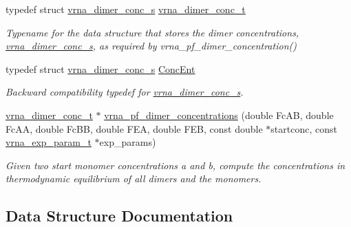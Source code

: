 \begin{DoxyCompactItemize}
\item 
\mbox{\label{group__pf__cofold_gac48c2723444ecfdceafcfd525ca98322}} 
typedef struct \hyperlink{structvrna__dimer__conc__s}{vrna\+\_\+dimer\+\_\+conc\+\_\+s} \hyperlink{group__pf__cofold_gac48c2723444ecfdceafcfd525ca98322}{vrna\+\_\+dimer\+\_\+conc\+\_\+t}
\begin{DoxyCompactList}\small\item\em Typename for the data structure that stores the dimer concentrations, \hyperlink{structvrna__dimer__conc__s}{vrna\+\_\+dimer\+\_\+conc\+\_\+s}, as required by vrna\+\_\+pf\+\_\+dimer\+\_\+concentration() \end{DoxyCompactList}\item 
\mbox{\label{group__pf__cofold_ga46244c7adf5040580291c45b465f4efa}} 
typedef struct \hyperlink{structvrna__dimer__conc__s}{vrna\+\_\+dimer\+\_\+conc\+\_\+s} \hyperlink{group__pf__cofold_ga46244c7adf5040580291c45b465f4efa}{Conc\+Ent}
\begin{DoxyCompactList}\small\item\em Backward compatibility typedef for \hyperlink{structvrna__dimer__conc__s}{vrna\+\_\+dimer\+\_\+conc\+\_\+s}. \end{DoxyCompactList}\item 
\hyperlink{group__pf__cofold_gac48c2723444ecfdceafcfd525ca98322}{vrna\+\_\+dimer\+\_\+conc\+\_\+t} $\ast$ \hyperlink{group__pf__cofold_ga83b8d5d0f7875d6d5013b208f23e3356}{vrna\+\_\+pf\+\_\+dimer\+\_\+concentrations} (double Fc\+AB, double Fc\+AA, double Fc\+BB, double F\+EA, double F\+EB, const double $\ast$startconc, const \hyperlink{group__energy__parameters_ga01d8b92fe734df8d79a6169482c7d8d8}{vrna\+\_\+exp\+\_\+param\+\_\+t} $\ast$exp\+\_\+params)
\begin{DoxyCompactList}\small\item\em Given two start monomer concentrations a and b, compute the concentrations in thermodynamic equilibrium of all dimers and the monomers. \end{DoxyCompactList}\end{DoxyCompactItemize}


\subsection{Data Structure Documentation}
\label{structvrna__dimer__pf__s}

